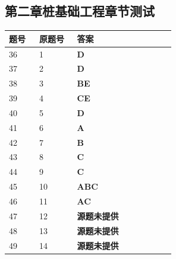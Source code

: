 \documentclass[UTF8,fontset=windows,11pt]{ctexart}
\begin{document}
\subsection*{第二章桩基础工程章节测试}
\begin{longtable}{p{0.16\linewidth}p{0.2\linewidth}p{0.52\linewidth}}
\textbf{\textcolor{examnavy}{题号}} & \textbf{\textcolor{examnavy}{原题号}} & \textbf{\textcolor{answergreen}{答案}} \\
\hline
36 & 1 & \textbf{\textcolor{answergreen}{D}} \\
37 & 2 & \textbf{\textcolor{answergreen}{D}} \\
38 & 3 & \textbf{\textcolor{answergreen}{BE}} \\
39 & 4 & \textbf{\textcolor{answergreen}{CE}} \\
40 & 5 & \textbf{\textcolor{answergreen}{D}} \\
41 & 6 & \textbf{\textcolor{answergreen}{A}} \\
42 & 7 & \textbf{\textcolor{answergreen}{B}} \\
43 & 8 & \textbf{\textcolor{answergreen}{C}} \\
44 & 9 & \textbf{\textcolor{answergreen}{C}} \\
45 & 10 & \textbf{\textcolor{answergreen}{ABC}} \\
46 & 11 & \textbf{\textcolor{answergreen}{AC}} \\
47 & 12 & \textbf{\textcolor{answergreen}{源题未提供}} \\
48 & 13 & \textbf{\textcolor{answergreen}{源题未提供}} \\
49 & 14 & \textbf{\textcolor{answergreen}{源题未提供}} \\
\end{longtable}
\vspace{0.4em}
\end{document}
